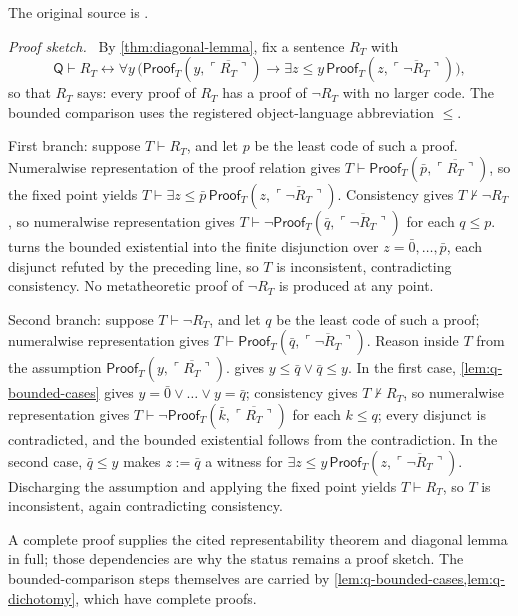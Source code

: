 \documentclass[11pt,oneside,openany]{book}
\theoremstyle{definition}
\theoremstyle{plain}
\theoremstyle{remark}
\newenvironment{proofplan}{\par\noindent\textit{Proof sketch.}\ }{\par}
\newcommand{\derives}{\vdash}
\newcommand{\notderives}{\not\vdash}
\newcommand{\defeq}{\mathrel{:=}}
\begin{document}
The original source is \cite{Rosser1936}.

\begin{proofplan}
By \cref{thm:diagonal-lemma}, fix a sentence \(R_T\) with
\[
  \mathsf Q\derives R_T\leftrightarrow\forall y\,\bigl(
  \mathsf{Proof}_T(y,\overline{\ulcorner R_T\urcorner})\to
  \exists z\leq y\,
  \mathsf{Proof}_T(z,\overline{\ulcorner\neg R_T\urcorner})\bigr),
\]
so that \(R_T\) says: every proof of \(R_T\) has a proof of \(\neg R_T\)
with no larger code.  The bounded comparison uses the registered
object-language abbreviation \(\leq\).

First branch: suppose \(T\derives R_T\), and let \(p\) be the least code
of such a proof.  Numeralwise representation of the proof relation gives
\(T\derives\mathsf{Proof}_T(\bar p,\overline{\ulcorner R_T\urcorner})\),
so the fixed point yields
\(T\derives\exists z\leq\bar p\,
\mathsf{Proof}_T(z,\overline{\ulcorner\neg R_T\urcorner})\).
Consistency gives \(T\notderives\neg R_T\), so numeralwise representation
gives
\(T\derives\neg\mathsf{Proof}_T(\bar q,
\overline{\ulcorner\neg R_T\urcorner})\) for each \(q\leq p\).
 turns the bounded existential into the finite
disjunction over \(z=\bar0,\ldots,\bar p\), each disjunct refuted by the
preceding line, so \(T\) is inconsistent, contradicting consistency.  No
metatheoretic proof of \(\neg R_T\) is produced at any point.

Second branch: suppose \(T\derives\neg R_T\), and let \(q\) be the least
code of such a proof; numeralwise representation gives
\(T\derives\mathsf{Proof}_T(\bar q,
\overline{\ulcorner\neg R_T\urcorner})\).  Reason inside \(T\) from the
assumption \(\mathsf{Proof}_T(y,\overline{\ulcorner R_T\urcorner})\).
 gives \(y\leq\bar q\lor\bar q\leq y\).  In the
first case, \cref{lem:q-bounded-cases} gives
\(y=\bar0\lor\dots\lor y=\bar q\); consistency gives
\(T\notderives R_T\), so numeralwise representation gives
\(T\derives\neg\mathsf{Proof}_T(\bar k,
\overline{\ulcorner R_T\urcorner})\) for each \(k\leq q\); every
disjunct is contradicted, and the bounded existential follows from the
contradiction.  In the second case, \(\bar q\leq y\) makes
\(z\defeq\bar q\) a witness for
\(\exists z\leq y\,
\mathsf{Proof}_T(z,\overline{\ulcorner\neg R_T\urcorner})\).
Discharging the assumption and applying the fixed point yields
\(T\derives R_T\), so \(T\) is inconsistent, again contradicting
consistency.

A complete proof supplies the cited representability theorem and diagonal
lemma in full; those dependencies are why the status remains a proof
sketch.  The bounded-comparison steps themselves are carried by
\cref{lem:q-bounded-cases,lem:q-dichotomy}, which have complete proofs.
\end{proofplan}
\end{document}
